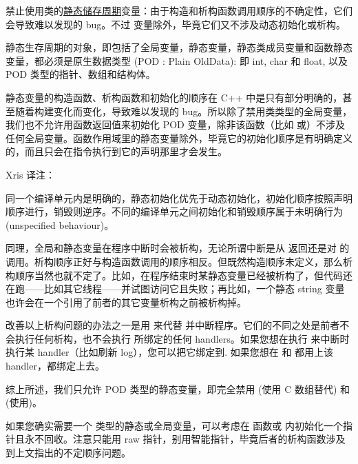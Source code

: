 禁止使用类的\href{http://zh.cppreference.com/w/cpp/language/storage_duration#.E5.AD.98.E5.82.A8.E6.9C.9F}{静态储存周期}变量：由于构造和析构函数调用顺序的不确定性，它们会导致难以发现的 bug。不过 变量除外，毕竟它们又不涉及动态初始化或析构。

静态生存周期的对象，即包括了全局变量，静态变量，静态类成员变量和函数静态变量，都必须是原生数据类型 (POD : Plain OldData): 即 int, char 和 float, 以及 POD 类型的指针、数组和结构体。

静态变量的构造函数、析构函数和初始化的顺序在 C++ 中是只有部分明确的，甚至随着构建变化而变化，导致难以发现的 bug。所以除了禁用类类型的全局变量，我们也不允许用函数返回值来初始化 POD 变量，除非该函数（比如  或）不涉及任何全局变量。函数作用域里的静态变量除外，毕竟它的初始化顺序是有明确定义的，而且只会在指令执行到它的声明那里才会发生。

\begin{DNote}
  Xris 译注：

  同一个编译单元内是明确的，静态初始化优先于动态初始化，初始化顺序按照声明顺序进行，销毁则逆序。不同的编译单元之间初始化和销毁顺序属于未明确行为
  (unspecified behaviour)。

\end{DNote}

同理，全局和静态变量在程序中断时会被析构，无论所谓中断是从  返回还是对  的调用。析构顺序正好与构造函数调用的顺序相反。但既然构造顺序未定义，那么析构顺序当然也就不定了。比如，在程序结束时某静态变量已经被析构了，但代码还在跑——比如其它线程——并试图访问它且失败；再比如，一个静态 string 变量也许会在一个引用了前者的其它变量析构之前被析构掉。

改善以上析构问题的办法之一是用  来代替 并中断程序。它们的不同之处是前者不会执行任何析构，也不会执行  所绑定的任何 handlers。如果您想在执行  来中断时执行某 handler（比如刷新 log），您可以把它绑定到. 如果您想在  和  都用上该 handler，都绑定上去。

综上所述，我们只允许 POD 类型的静态变量，即完全禁用  (使用 C 数组替代) 和  (使用)。

如果您确实需要一个  类型的静态或全局变量，可以考虑在  函数或 
内初始化一个指针且永不回收。注意只能用 raw 指针，别用智能指针，毕竟后者的析构函数涉及到上文指出的不定顺序问题。


